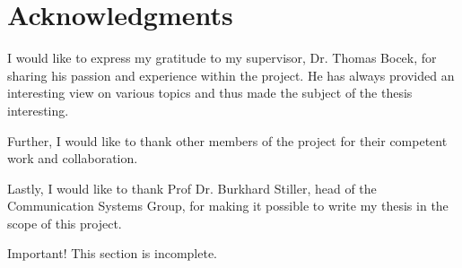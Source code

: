 \chapter*{Acknowledgments}

I would like to express my gratitude to my supervisor, Dr. Thomas Bocek, for sharing his passion and experience within the project. He has always provided an interesting view on various topics and thus made the subject of the thesis interesting.

Further, I would like to thank other members of the project for their competent work and collaboration.

Lastly, I would like to thank Prof Dr. Burkhard Stiller, head of the Communication Systems Group, for making it possible to write my thesis in the scope of this project.

\begin{bclogo}[logo=\bcattention, couleurBarre=red, noborder=true, 
               couleur=LightSalmon]{Important!}
This section is incomplete.
\end{bclogo}